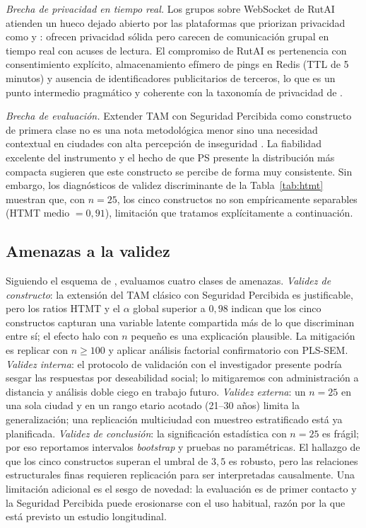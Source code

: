 \documentclass[a4paper,fleqn]{cas-sc}
\newcommand{\RUTAI}{RutAI\xspace}
\newcommand{\TAM}{TAM\xspace}
\begin{document}
	\emph{Brecha de privacidad en tiempo real.} Los grupos sobre WebSocket de \RUTAI atienden un hueco dejado abierto por las plataformas que priorizan privacidad como \citet{mckenzie2022privyto} y \citet{shokri2014mobicrowd}: ofrecen privacidad s\'olida pero carecen de comunicaci\'on grupal en tiempo real con acuses de lectura. El compromiso de \RUTAI es pertenencia con consentimiento expl\'icito, almacenamiento ef\'imero de pings en Redis (TTL de 5 minutos) y ausencia de identificadores publicitarios de terceros, lo que es un punto intermedio pragm\'atico y coherente con la taxonom\'ia de privacidad de \citet{li2017locsharing}.
	
	\emph{Brecha de evaluaci\'on.} Extender \TAM con Seguridad Percibida como constructo de primera clase no es una nota metodol\'ogica menor sino una necesidad contextual en ciudades con alta percepci\'on de inseguridad \citep{tapia2024inseguridad,maloney2025worldbank,inegi2024ensu}. La fiabilidad excelente del instrumento y el hecho de que PS presente la distribuci\'on m\'as compacta sugieren que este constructo se percibe de forma muy consistente. Sin embargo, los diagn\'osticos de validez discriminante de la Tabla~\ref{tab:htmt} muestran que, con $n=25$, los cinco constructos no son emp\'iricamente separables (HTMT medio $=0{,}91$), limitaci\'on que tratamos expl\'icitamente a continuaci\'on.
	
	\subsection{Amenazas a la validez}\label{sec:threats}
	
	Siguiendo el esquema de \citet{wohlin2012experimentation}, evaluamos cuatro clases de amenazas. \emph{Validez de constructo}: la extensi\'on del \TAM cl\'asico con Seguridad Percibida es justificable, pero los ratios HTMT y el $\alpha$ global superior a $0{,}98$ indican que los cinco constructos capturan una variable latente compartida m\'as de lo que discriminan entre s\'i; el efecto halo con $n$ peque\~no es una explicaci\'on plausible. La mitigaci\'on es replicar con $n\geq 100$ y aplicar an\'alisis factorial confirmatorio con PLS-SEM. \emph{Validez interna}: el protocolo de validaci\'on con el investigador presente podr\'ia sesgar las respuestas por deseabilidad social; lo mitigaremos con administraci\'on a distancia y an\'alisis doble ciego en trabajo futuro. \emph{Validez externa}: un $n=25$ en una sola ciudad y en un rango etario acotado (21--30 a\~nos) limita la generalizaci\'on; una replicaci\'on multiciudad con muestreo estratificado est\'a ya planificada. \emph{Validez de conclusi\'on}: la significaci\'on estad\'istica con $n=25$ es fr\'agil; por eso reportamos intervalos \emph{bootstrap} y pruebas no param\'etricas. El hallazgo de que los cinco constructos superan el umbral de $3{,}5$ es robusto, pero las relaciones estructurales finas requieren replicaci\'on para ser interpretadas causalmente. Una limitaci\'on adicional es el sesgo de novedad: la evaluaci\'on es de primer contacto y la Seguridad Percibida puede erosionarse con el uso habitual, raz\'on por la que est\'a previsto un estudio longitudinal.
	
\end{document}
